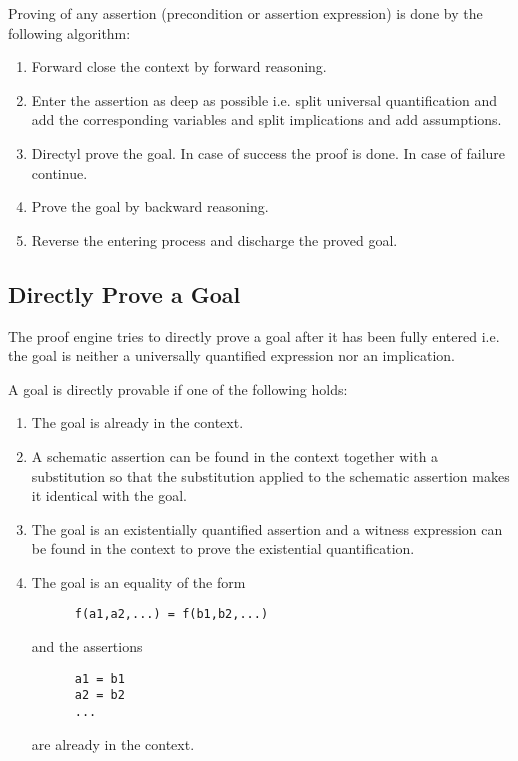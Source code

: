 Proving of any assertion (precondition or assertion expression) is done by
the following algorithm:

\begin{enumerate}
\item Forward close the context by forward reasoning.

\item Enter the assertion as deep as possible i.e. split universal
  quantification and add the corresponding variables and split implications
  and add assumptions.

\item Directyl prove the goal. In case of success the proof is done. In case
  of failure continue.

\item Prove the goal by backward reasoning.

\item Reverse the entering process and discharge the proved goal.
\end{enumerate}


\subsection{Directly Prove a Goal}

The proof engine tries to directly prove a goal after it has been fully
entered i.e. the goal is neither a universally quantified expression nor an
implication.

A goal is directly provable if one of the following holds:
\begin{enumerate}
\item The goal is already in the context.

\item A schematic assertion can be found in the context together with a
  substitution so that the substitution applied to the schematic assertion
  makes it identical with the goal.

\item The goal is an existentially quantified assertion and a witness
  expression can be found in the context to prove the existential
  quantification.

\item The goal is an equality of the form
  \begin{lstlisting}
      f(a1,a2,...) = f(b1,b2,...)
  \end{lstlisting}
  and the assertions
  \begin{lstlisting}
      a1 = b1
      a2 = b2
      ...
  \end{lstlisting}
  are already in the context.
\end{enumerate}



